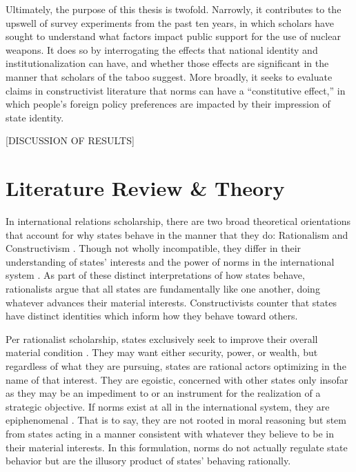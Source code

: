 \documentclass[12pt]{article}
\begin{document}
Ultimately, the purpose of this thesis is twofold. Narrowly, it contributes to the upswell of survey experiments from the past ten years, in which scholars have sought to understand what factors impact public support for the use of nuclear weapons. It does so by interrogating the effects that national identity and institutionalization can have, and whether those effects are significant in the manner that scholars of the taboo suggest. More broadly, it seeks to evaluate claims in constructivist literature that norms can have a “constitutive effect,” in which people's foreign policy preferences are impacted by their impression of state identity.

[DISCUSSION OF RESULTS]


\section{Literature Review \& Theory}

In international relations scholarship, there are two broad theoretical orientations that account for why states behave in the manner that they do: Rationalism and Constructivism \citep{katzenstein_international_1998}. Though not wholly incompatible, they differ in their understanding of states' interests and the power of norms in the international system \citep{fearon_skeptical_2002}. As part of these distinct interpretations of how states behave, rationalists argue that all states are fundamentally like one another, doing whatever advances their material interests. Constructivists counter that states have distinct identities which inform how they behave toward others.

Per rationalist scholarship, states exclusively seek to improve their overall material condition \citep{waltz_man_2001, keohane_after_2005}. They may want either security, power, or wealth, but regardless of what they are pursuing, states are rational actors optimizing in the name of that interest. They are egoistic, concerned with other states only insofar as they may be an impediment to or an instrument for the realization of a strategic objective. If norms exist at all in the international system, they are epiphenomenal \citep{sagan_realist_2004}. That is to say, they are not rooted in moral reasoning but stem from states acting in a manner consistent with whatever they believe to be in their material interests. In this formulation, norms do not actually regulate state behavior but are the illusory product of states' behaving rationally.
\end{document}
